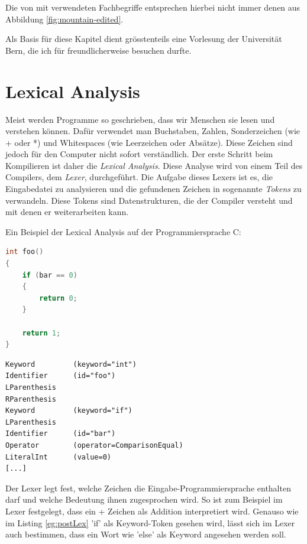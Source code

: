 Die von mit verwendeten Fachbegriffe entsprechen hierbei nicht immer denen aus Abbildung \ref{fig:mountain-edited}.

Als Basis für diese Kapitel dient grösstenteils eine Vorlesung der Universität Bern, die ich für freundlicherweise besuchen durfte.

\section{Lexical Analysis}
Meist werden Programme so geschrieben, dass wir Menschen sie lesen und verstehen können. Dafür verwendet man Buchstaben, Zahlen, Sonderzeichen (wie + oder *) und Whitespaces (wie Leerzeichen oder Absätze).
Diese Zeichen sind jedoch für den Computer nicht sofort verständlich. Der erste Schritt beim Kompilieren ist daher die \textit{Lexical Analysis}. Diese Analyse wird von einem Teil des Compilers, dem \textit{Lexer}, durchgeführt.
Die Aufgabe dieses Lexers ist es, die Eingabedatei zu analysieren und die gefundenen Zeichen in sogenannte \textit{Tokens} zu verwandeln. Diese Tokens sind Datenstrukturen, die der Compiler versteht und mit denen er weiterarbeiten kann.

Ein Beispiel der Lexical Analysis auf der Programmiersprache C:

\begin{lstlisting}[language=C, label=eg:preLex, caption=C code vor Lexical Analysis]
int foo()
{
    if (bar == 0)
    {
        return 0;
    }

    return 1;
}
\end{lstlisting}

\begin{lstlisting}[label=eg:postLex, caption=Tokens nach Lexical Analysis]
Keyword         (keyword="int")
Identifier      (id="foo")
LParenthesis
RParenthesis
Keyword         (keyword="if")
LParenthesis
Identifier      (id="bar")
Operator        (operator=ComparisonEqual)
LiteralInt      (value=0)
[...]
\end{lstlisting}

Der Lexer legt fest, welche Zeichen die Eingabe-Programmiersprache enthalten darf und welche Bedeutung ihnen zugesprochen wird. So ist zum Beispiel im Lexer festgelegt, dass ein + Zeichen als Addition interpretiert wird.
Genauso wie im Listing \ref{eg:postLex} {\listingFont\selectfont 'if'} als Keyword-Token gesehen wird, lässt sich im Lexer auch bestimmen, dass ein Wort wie {\listingFont\selectfont 'else'} als Keyword angesehen werden soll.

